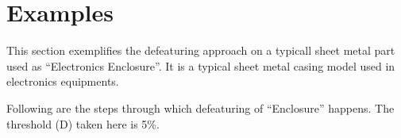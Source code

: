 
\section{Examples} \label{sec:defeaturing:results}


This section exemplifies the defeaturing approach on a typicall sheet metal part used as ``Electronics Enclosure''.  It is a typical sheet metal casing model used in electronics equipments. 


Following are the steps through which defeaturing of ``Enclosure'' happens. The threshold (D) taken here is 5\%.






